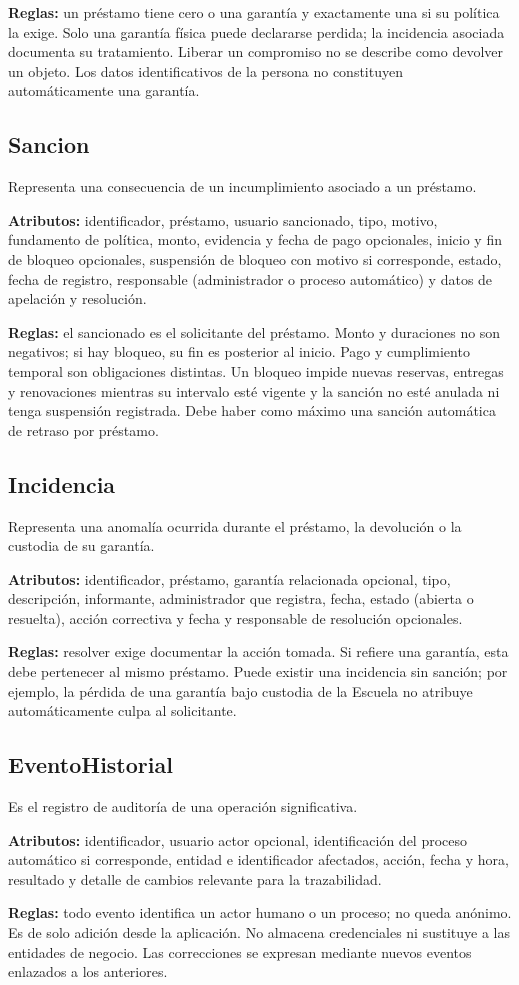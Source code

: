 \textbf{Reglas:} un pr\'estamo tiene cero o una garant\'ia y exactamente una si su pol\'itica la exige. Solo una garant\'ia f\'isica puede declararse perdida; la incidencia asociada documenta su tratamiento. Liberar un compromiso no se describe como devolver un objeto. Los datos identificativos de la persona no constituyen autom\'aticamente una garant\'ia.

\subsection{Sancion}
Representa una consecuencia de un incumplimiento asociado a un pr\'estamo.

\textbf{Atributos:} identificador, pr\'estamo, usuario sancionado, tipo, motivo, fundamento de pol\'itica, monto, evidencia y fecha de pago opcionales, inicio y fin de bloqueo opcionales, suspensi\'on de bloqueo con motivo si corresponde, estado, fecha de registro, responsable (administrador o proceso autom\'atico) y datos de apelaci\'on y resoluci\'on.

\textbf{Reglas:} el sancionado es el solicitante del pr\'estamo. Monto y duraciones no son negativos; si hay bloqueo, su fin es posterior al inicio. Pago y cumplimiento temporal son obligaciones distintas. Un bloqueo impide nuevas reservas, entregas y renovaciones mientras su intervalo est\'e vigente y la sanci\'on no est\'e anulada ni tenga suspensi\'on registrada. Debe haber como m\'aximo una sanci\'on autom\'atica de retraso por pr\'estamo.

\subsection{Incidencia}
Representa una anomal\'ia ocurrida durante el pr\'estamo, la devoluci\'on o la custodia de su garant\'ia.

\textbf{Atributos:} identificador, pr\'estamo, garant\'ia relacionada opcional, tipo, descripci\'on, informante, administrador que registra, fecha, estado (abierta o resuelta), acci\'on correctiva y fecha y responsable de resoluci\'on opcionales.

\textbf{Reglas:} resolver exige documentar la acci\'on tomada. Si refiere una garant\'ia, esta debe pertenecer al mismo pr\'estamo. Puede existir una incidencia sin sanci\'on; por ejemplo, la p\'erdida de una garant\'ia bajo custodia de la Escuela no atribuye autom\'aticamente culpa al solicitante.

\subsection{EventoHistorial}
Es el registro de auditor\'ia de una operaci\'on significativa.

\textbf{Atributos:} identificador, usuario actor opcional, identificaci\'on del proceso autom\'atico si corresponde, entidad e identificador afectados, acci\'on, fecha y hora, resultado y detalle de cambios relevante para la trazabilidad.

\textbf{Reglas:} todo evento identifica un actor humano o un proceso; no queda an\'onimo. Es de solo adici\'on desde la aplicaci\'on. No almacena credenciales ni sustituye a las entidades de negocio. Las correcciones se expresan mediante nuevos eventos enlazados a los anteriores.
